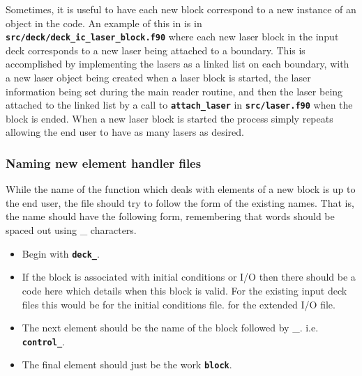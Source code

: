 \documentclass[12pt,a4paper]{article}
\newcommand{\inlinecode}[1]{{\color{warwickred} \bf\texttt{#1}}}
\newcommand{\EPOCH}{{\color{warwickdark}\fontfamily{phv}\selectfont{EPOCH}}}
\begin{document}
Sometimes, it is useful to have each new block correspond to a new instance of
an object in the code. An example of this in {\EPOCH} is in
\inlinecode{src/deck/deck\_ic\_laser\_block.f90} where each new laser block in
the input deck corresponds to a new laser being attached to a boundary. This is
accomplished by implementing the lasers as a linked list on each boundary,
with a new laser object being created when a laser block is started, the laser
information being set during the main reader routine, and then the laser being
attached to the linked list by a call to \inlinecode{attach\_laser} in
\inlinecode{src/laser.f90} when the block is ended. When a new laser block is
started the process simply repeats allowing the end user to have as many lasers
as desired.

\subsubsection{Naming new element handler files}
While the name of the function which deals with elements of a new block is up
to the end user, the file should try to follow the form of the existing
names. That is, the name should have the following form, remembering that words
should be spaced out using \_ characters.
\begin{itemize}
\item Begin with \inlinecode{deck\_}.
\item If the block is associated with initial conditions or I/O then there
  should be a code here which details
  when this block is valid. For the existing input deck files this would be
  \subitem \inlinecode{ic\_} for the initial conditions file.
  \subitem \inlinecode{eio\_} for the extended I/O file.
\item The next element should be the name of the block followed by \_.
  i.e. \inlinecode{control\_}.
\item The final element should just be the work \inlinecode{block}.
\end{itemize}
\end{document}
